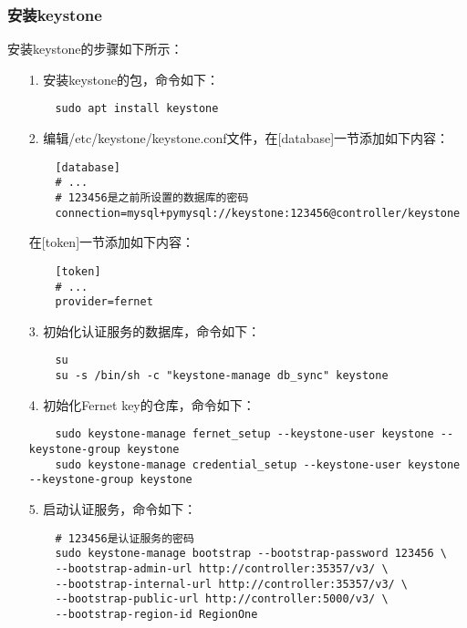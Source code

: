 \documentclass[a4paper,left=2.5cm,right=2.5cm,11pt]{article}
\begin{document}
\subsubsection{安装keystone}
	安装keystone的步骤如下所示：
	\begin{itemize}
		\item[1.] 安装keystone的包，命令如下：
		\begin{lstlisting}
	sudo apt install keystone
		\end{lstlisting}

		\item[2.] 编辑/etc/keystone/keystone.conf文件，在[database]一节添加如下内容：
		\begin{lstlisting}
	[database]
	# ...
	# 123456是之前所设置的数据库的密码
	connection=mysql+pymysql://keystone:123456@controller/keystone
		\end{lstlisting}

		在[token]一节添加如下内容：
		\begin{lstlisting}
	[token]
	# ...
	provider=fernet
		\end{lstlisting}

		\item[3.] 初始化认证服务的数据库，命令如下：
		\begin{lstlisting}
	su
	su -s /bin/sh -c "keystone-manage db_sync" keystone
		\end{lstlisting}

		\item[4.] 初始化Fernet key的仓库，命令如下：
		\begin{lstlisting}
	sudo keystone-manage fernet_setup --keystone-user keystone --keystone-group keystone
	sudo keystone-manage credential_setup --keystone-user keystone --keystone-group keystone
		\end{lstlisting}

		\item[5.] 启动认证服务，命令如下：
		\begin{lstlisting}
	# 123456是认证服务的密码
	sudo keystone-manage bootstrap --bootstrap-password 123456 \
	--bootstrap-admin-url http://controller:35357/v3/ \
	--bootstrap-internal-url http://controller:35357/v3/ \
	--bootstrap-public-url http://controller:5000/v3/ \
	--bootstrap-region-id RegionOne
		\end{lstlisting}
	\end{itemize}
\end{document}
